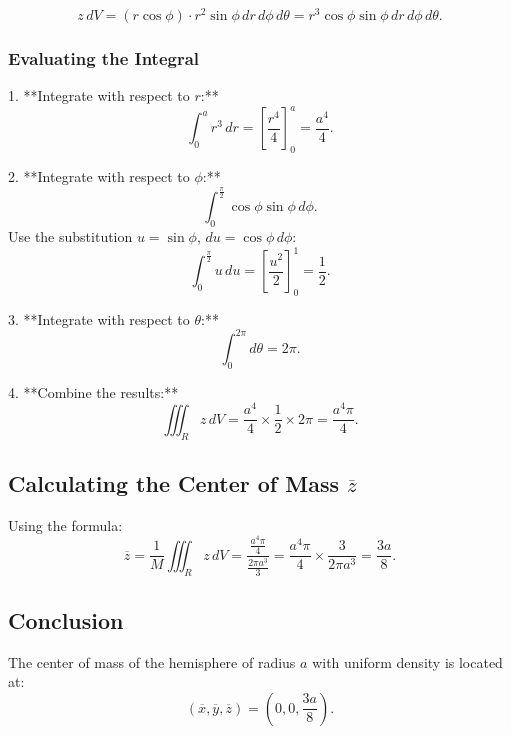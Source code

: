 \documentclass[11pt]{article}
\begin{document}
\[
z \, dV = (r \cos\phi) \cdot r^2 \sin\phi \, dr \, d\phi \, d\theta = r^3 \cos\phi \sin\phi \, dr \, d\phi \, d\theta.
\]

\newpage

\subsubsection{Evaluating the Integral}

1. **Integrate with respect to \( r \):**
\[
\int_{0}^{a} r^3 \, dr = \left[ \frac{r^4}{4} \right]_{0}^{a} = \frac{a^4}{4}.
\]

2. **Integrate with respect to \( \phi \):**
\[
\int_{0}^{\frac{\pi}{2}} \cos\phi \sin\phi \, d\phi.
\]
Use the substitution \( u = \sin\phi \), \( du = \cos\phi \, d\phi \):
\[
\int_{0}^{\frac{\pi}{2}} u \, du = \left[ \frac{u^2}{2} \right]_{0}^{1} = \frac{1}{2}.
\]

3. **Integrate with respect to \( \theta \):**
\[
\int_{0}^{2\pi} d\theta = 2\pi.
\]

4. **Combine the results:**
\[
\iiint_{R} z \, dV = \frac{a^4}{4} \times \frac{1}{2} \times 2\pi = \frac{a^4 \pi}{4}.
\]

\newpage

\subsection{Calculating the Center of Mass \( \overline{z} \)}

Using the formula:
\[
\overline{z} = \frac{1}{M} \iiint_{R} z \, dV = \frac{\frac{a^4 \pi}{4}}{\frac{2\pi a^3}{3}} = \frac{a^4 \pi}{4} \times \frac{3}{2\pi a^3} = \frac{3a}{8}.
\]

\newpage

\subsection{Conclusion}

The center of mass of the hemisphere of radius \( a \) with uniform density is located at:
\[
\left( \overline{x}, \overline{y}, \overline{z} \right) = \left( 0, 0, \frac{3a}{8} \right).
\]
\end{document}
